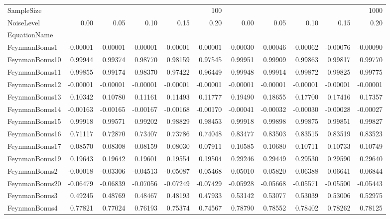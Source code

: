 \begin{tabular}{lrrrrrrrrrr}
\toprule
SampleSize & \multicolumn{5}{r}{100} & \multicolumn{5}{r}{1000} \\
NoiseLevel & 0.00 & 0.05 & 0.10 & 0.15 & 0.20 & 0.00 & 0.05 & 0.10 & 0.15 & 0.20 \\
EquationName &  &  &  &  &  &  &  &  &  &  \\
\midrule
FeynmanBonus1 & -0.00001 & -0.00001 & -0.00001 & -0.00001 & -0.00001 & -0.00030 & -0.00046 & -0.00062 & -0.00076 & -0.00090 \\
FeynmanBonus10 & 0.99944 & 0.99374 & 0.98770 & 0.98159 & 0.97545 & 0.99951 & 0.99909 & 0.99863 & 0.99817 & 0.99770 \\
FeynmanBonus11 & 0.99855 & 0.99174 & 0.98370 & 0.97422 & 0.96449 & 0.99948 & 0.99914 & 0.99872 & 0.99825 & 0.99775 \\
FeynmanBonus12 & -0.00001 & -0.00001 & -0.00001 & -0.00001 & -0.00001 & -0.00001 & -0.00001 & -0.00001 & -0.00001 & -0.00001 \\
FeynmanBonus13 & 0.10342 & 0.10780 & 0.11161 & 0.11493 & 0.11777 & 0.19490 & 0.18655 & 0.17700 & 0.17416 & 0.17357 \\
FeynmanBonus14 & -0.00163 & -0.00165 & -0.00167 & -0.00168 & -0.00170 & -0.00041 & -0.00032 & -0.00030 & -0.00028 & -0.00027 \\
FeynmanBonus15 & 0.99918 & 0.99571 & 0.99202 & 0.98829 & 0.98453 & 0.99918 & 0.99898 & 0.99875 & 0.99851 & 0.99827 \\
FeynmanBonus16 & 0.71117 & 0.72870 & 0.73407 & 0.73786 & 0.74048 & 0.83477 & 0.83503 & 0.83515 & 0.83519 & 0.83523 \\
FeynmanBonus17 & 0.08570 & 0.08308 & 0.08159 & 0.08030 & 0.07911 & 0.10585 & 0.10680 & 0.10711 & 0.10733 & 0.10749 \\
FeynmanBonus19 & 0.19643 & 0.19642 & 0.19601 & 0.19554 & 0.19504 & 0.29246 & 0.29449 & 0.29530 & 0.29590 & 0.29640 \\
FeynmanBonus2 & -0.00018 & -0.03306 & -0.04513 & -0.05087 & -0.05468 & 0.05010 & 0.05820 & 0.06388 & 0.06641 & 0.06844 \\
FeynmanBonus20 & -0.06479 & -0.06839 & -0.07056 & -0.07249 & -0.07429 & -0.05928 & -0.05668 & -0.05571 & -0.05500 & -0.05443 \\
FeynmanBonus3 & 0.49245 & 0.48769 & 0.48467 & 0.48193 & 0.47933 & 0.53142 & 0.53077 & 0.53039 & 0.53006 & 0.52975 \\
FeynmanBonus4 & 0.77821 & 0.77024 & 0.76193 & 0.75374 & 0.74567 & 0.78790 & 0.78552 & 0.78402 & 0.78262 & 0.78125 \\

\end{tabular}
